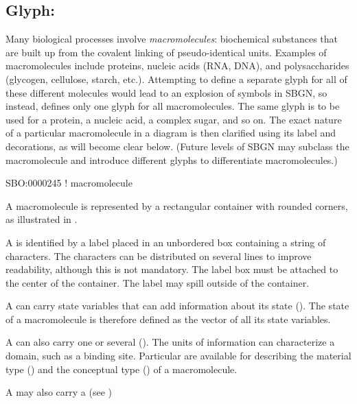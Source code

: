 
\subsection{Glyph: }
\label{sec:macromolecule}

Many biological processes involve \emph{macromolecules}: biochemical substances that are built up from the covalent linking of pseudo-identical units.  Examples of macromolecules include proteins, nucleic acids (RNA, DNA), and polysaccharides (glycogen, cellulose, starch, etc.).  Attempting to define a separate glyph for all of these different molecules would lead to an explosion of symbols in SBGN, so instead, \SBGNPDLone defines only one glyph for all macromolecules.  The same glyph is to be used for a protein, a nucleic acid, a complex sugar, and so on.  The exact nature of a particular macromolecule in a diagram is then clarified using its label and decorations, as will become clear below.  (Future levels of SBGN may subclass the macromolecule and introduce different glyphs to differentiate macromolecules.)

\begin{glyphDescription}

\glyphSboTerm SBO:0000245 ! macromolecule 

\glyphContainer A macromolecule is represented by a rectangular container with rounded corners, as illustrated in .

\glyphLabel A  is identified by a label placed in an unbordered box containing a string of characters.  The characters can be distributed on several lines to improve readability, although this is not mandatory.  The label box must be attached to the center of the container.  The label may spill outside of the container.

\glyphAux A  can carry state variables that can add information about its state ().  The state of a macromolecule is therefore defined as the vector of all its state variables. 

A  can also carry one or several  ().  The units of information can characterize a domain, such as a binding site.  Particular  are available for describing the material type () and the conceptual type () of a macromolecule.  

A  may also carry a  (see )

\end{glyphDescription}

